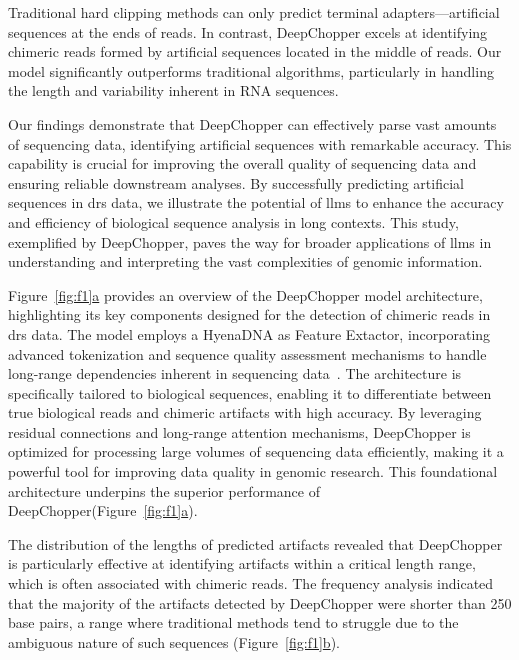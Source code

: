 \documentclass[pdflatex, sn-mathphys-num, lineno]{sn-jnl}%
\newcommand{\chopper}{DeepChopper\xspace}
\newcommand{\figref}[2]{Figure~\hyperref[#1]{\ref*{#1}#2}}
\theoremstyle{thmstyleone}%
\theoremstyle{thmstyletwo}%
\theoremstyle{thmstylethree}%
\begin{document}
Traditional hard clipping methods can only predict terminal adapters—artificial sequences at the ends of reads.
In contrast, \chopper excels at identifying chimeric reads formed by artificial sequences located in the middle of reads.
Our model significantly outperforms traditional algorithms, particularly in handling the length and variability inherent in RNA sequences.

Our findings demonstrate that DeepChopper can effectively parse vast amounts of sequencing data, identifying artificial sequences with remarkable accuracy.
This capability is crucial for improving the overall quality of sequencing data and ensuring reliable downstream analyses.
By successfully predicting artificial sequences in \gls{drs} data, we illustrate the potential of \glspl{llm} to enhance the accuracy and efficiency of biological sequence analysis in long contexts.
This study, exemplified by \chopper, paves the way for broader applications of \glspl{llm} in understanding and interpreting the vast complexities of genomic information.





\figref{fig:f1}{a} provides an overview of the \chopper model architecture, highlighting its key components designed for the detection of chimeric reads in \gls{drs} data.
The model employs a HyenaDNA as Feature Extactor, incorporating advanced tokenization and sequence quality assessment mechanisms to handle long-range dependencies inherent in sequencing data~\cite{nguyen2024hyenadna}.
The architecture is specifically tailored to biological sequences, enabling it to differentiate between true biological reads and chimeric artifacts with high accuracy.
By leveraging residual connections and long-range attention mechanisms, \chopper is optimized for processing large volumes of sequencing data efficiently, making it a powerful tool for improving data quality in genomic research. This foundational architecture underpins the superior performance of \chopper (\figref{fig:f1}{a}).



The distribution of the lengths of predicted artifacts revealed that \chopper is particularly effective at identifying artifacts within a critical length range, which is often associated with chimeric reads.
The frequency analysis indicated that the majority of the artifacts detected by \chopper were shorter than 250 base pairs, a range where traditional methods tend to struggle due to the ambiguous nature of such sequences (\figref{fig:f1}{b}).
\end{document}
